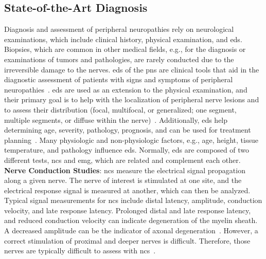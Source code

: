 \subsection{State-of-the-Art Diagnosis}
Diagnosis and assessment of peripheral neuropathies rely on neurological examinations, which include clinical history, physical examination, and \gls{eds}. Biopsies, which are common in other medical fields, e.g., for the diagnosis or examinations of tumors and pathologies, are rarely conducted due to the irreversible damage to the nerves. \gls{eds} of the \gls{pns} are clinical tools that aid in the diagnostic assessment of patients with signs and symptoms of peripheral neuropathies~\cite{Mohassel2015}. \gls{eds} are used as an extension to the physical examination, and their primary goal is to help with the localization of peripheral nerve lesions and to assess their distribution (focal, multifocal, or generalized; one segment, multiple segments, or diffuse within the nerve)~\cite{Mohassel2015}. Additionally, \gls{eds} help determining age, severity, pathology, prognosis, and can be used for treatment planning~\cite{Mohassel2015}. Many physiologic and non-physiologic factors, e.g., age, height, tissue temperature, and pathology influence \gls{eds}. Normally, \gls{eds} are composed of two different tests, \gls{ncs} and \gls{emg}, which are related and complement each other.\\

\textbf{Nerve Conduction Studies}: \gls{ncs} measure the electrical signal propagation along a given nerve. The nerve of interest is stimulated at one site, and the electrical response signal is measured at another, which can then be analyzed. Typical signal measurements for \gls{ncs} include distal latency, amplitude, conduction velocity, and late response latency. Prolonged distal and late response latency, and reduced conduction velocity can indicate degeneration of the myelin sheath. A decreased amplitude can be the indicator of axonal degeneration~\cite{Mohassel2015}. However, a correct stimulation of proximal and deeper nerves is difficult. Therefore, those nerves are typically difficult to assess with \gls{ncs}~\cite{Mohassel2015}. \\

